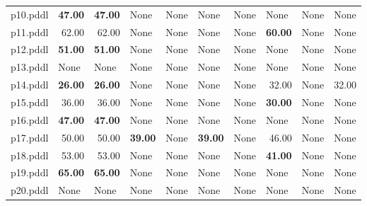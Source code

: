 \documentclass{article}
\begin{document}
\begin{tabular}{@{}lrrrrrrrrr@{}}
p10.pddl & \textbf{47.00} & \textbf{47.00} & \multicolumn{1}{|l|}{None} & \multicolumn{1}{|l|}{None} & \multicolumn{1}{|l|}{None} & \multicolumn{1}{|l|}{None} & \multicolumn{1}{|l|}{None} & \multicolumn{1}{|l|}{None} & \multicolumn{1}{|l|}{None} \\
p11.pddl & 62.00 & 62.00 & \multicolumn{1}{|l|}{None} & \multicolumn{1}{|l|}{None} & \multicolumn{1}{|l|}{None} & \multicolumn{1}{|l|}{None} & \textbf{60.00} & \multicolumn{1}{|l|}{None} & \multicolumn{1}{|l|}{None} \\
p12.pddl & \textbf{51.00} & \textbf{51.00} & \multicolumn{1}{|l|}{None} & \multicolumn{1}{|l|}{None} & \multicolumn{1}{|l|}{None} & \multicolumn{1}{|l|}{None} & \multicolumn{1}{|l|}{None} & \multicolumn{1}{|l|}{None} & \multicolumn{1}{|l|}{None} \\
p13.pddl & \multicolumn{1}{|l|}{None} & \multicolumn{1}{|l|}{None} & \multicolumn{1}{|l|}{None} & \multicolumn{1}{|l|}{None} & \multicolumn{1}{|l|}{None} & \multicolumn{1}{|l|}{None} & \multicolumn{1}{|l|}{None} & \multicolumn{1}{|l|}{None} & \multicolumn{1}{|l|}{None} \\
p14.pddl & \textbf{26.00} & \textbf{26.00} & \multicolumn{1}{|l|}{None} & \multicolumn{1}{|l|}{None} & \multicolumn{1}{|l|}{None} & \multicolumn{1}{|l|}{None} & 32.00 & \multicolumn{1}{|l|}{None} & 32.00 \\
p15.pddl & 36.00 & 36.00 & \multicolumn{1}{|l|}{None} & \multicolumn{1}{|l|}{None} & \multicolumn{1}{|l|}{None} & \multicolumn{1}{|l|}{None} & \textbf{30.00} & \multicolumn{1}{|l|}{None} & \multicolumn{1}{|l|}{None} \\
p16.pddl & \textbf{47.00} & \textbf{47.00} & \multicolumn{1}{|l|}{None} & \multicolumn{1}{|l|}{None} & \multicolumn{1}{|l|}{None} & \multicolumn{1}{|l|}{None} & \multicolumn{1}{|l|}{None} & \multicolumn{1}{|l|}{None} & \multicolumn{1}{|l|}{None} \\
p17.pddl & 50.00 & 50.00 & \textbf{39.00} & \multicolumn{1}{|l|}{None} & \textbf{39.00} & \multicolumn{1}{|l|}{None} & 46.00 & \multicolumn{1}{|l|}{None} & \multicolumn{1}{|l|}{None} \\
p18.pddl & 53.00 & 53.00 & \multicolumn{1}{|l|}{None} & \multicolumn{1}{|l|}{None} & \multicolumn{1}{|l|}{None} & \multicolumn{1}{|l|}{None} & \textbf{41.00} & \multicolumn{1}{|l|}{None} & \multicolumn{1}{|l|}{None} \\
p19.pddl & \textbf{65.00} & \textbf{65.00} & \multicolumn{1}{|l|}{None} & \multicolumn{1}{|l|}{None} & \multicolumn{1}{|l|}{None} & \multicolumn{1}{|l|}{None} & \multicolumn{1}{|l|}{None} & \multicolumn{1}{|l|}{None} & \multicolumn{1}{|l|}{None} \\
p20.pddl & \multicolumn{1}{|l|}{None} & \multicolumn{1}{|l|}{None} & \multicolumn{1}{|l|}{None} & \multicolumn{1}{|l|}{None} & \multicolumn{1}{|l|}{None} & \multicolumn{1}{|l|}{None} & \multicolumn{1}{|l|}{None} & \multicolumn{1}{|l|}{None} & \multicolumn{1}{|l|}{None} \\
\end{tabular}
\end{document}
